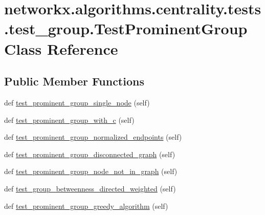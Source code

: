 \hypertarget{classnetworkx_1_1algorithms_1_1centrality_1_1tests_1_1test__group_1_1TestProminentGroup}{}\section{networkx.\+algorithms.\+centrality.\+tests.\+test\+\_\+group.\+Test\+Prominent\+Group Class Reference}
\label{classnetworkx_1_1algorithms_1_1centrality_1_1tests_1_1test__group_1_1TestProminentGroup}
\subsection*{Public Member Functions}
\begin{DoxyCompactItemize}
\item 
def \hyperlink{classnetworkx_1_1algorithms_1_1centrality_1_1tests_1_1test__group_1_1TestProminentGroup_af2b7a7dbf784aee2940b636b42cf3c3b}{test\+\_\+prominent\+\_\+group\+\_\+single\+\_\+node} (self)
\item 
def \hyperlink{classnetworkx_1_1algorithms_1_1centrality_1_1tests_1_1test__group_1_1TestProminentGroup_af1eb9de60a4dcabb2175a9b44647b753}{test\+\_\+prominent\+\_\+group\+\_\+with\+\_\+c} (self)
\item 
def \hyperlink{classnetworkx_1_1algorithms_1_1centrality_1_1tests_1_1test__group_1_1TestProminentGroup_ae731d7d4620a7a8803e4a9848abc8263}{test\+\_\+prominent\+\_\+group\+\_\+normalized\+\_\+endpoints} (self)
\item 
def \hyperlink{classnetworkx_1_1algorithms_1_1centrality_1_1tests_1_1test__group_1_1TestProminentGroup_ae136e1ab614c1356f5b62acebd6da59d}{test\+\_\+prominent\+\_\+group\+\_\+disconnected\+\_\+graph} (self)
\item 
def \hyperlink{classnetworkx_1_1algorithms_1_1centrality_1_1tests_1_1test__group_1_1TestProminentGroup_a94cea75223ed504f39ec22434463bf2d}{test\+\_\+prominent\+\_\+group\+\_\+node\+\_\+not\+\_\+in\+\_\+graph} (self)
\item 
def \hyperlink{classnetworkx_1_1algorithms_1_1centrality_1_1tests_1_1test__group_1_1TestProminentGroup_a61e77447d845799fad57af84f345ebe2}{test\+\_\+group\+\_\+betweenness\+\_\+directed\+\_\+weighted} (self)
\item 
def \hyperlink{classnetworkx_1_1algorithms_1_1centrality_1_1tests_1_1test__group_1_1TestProminentGroup_af48f76749d01eac8b4c92c9d310edfdf}{test\+\_\+prominent\+\_\+group\+\_\+greedy\+\_\+algorithm} (self)
\end{DoxyCompactItemize}
